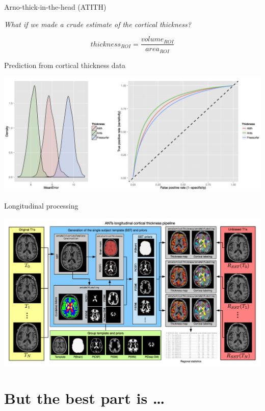 \documentclass[ignorenonframetext,]{beamer}
\begin{document}
\begin{frame}{Arno-thick-in-the-head (ATITH)}

\emph{What if we made a crude estimate of the cortical thickness?}

\[thickness_{ROI} = \frac{volume_{ROI}}{area_{ROI}}\]

\end{frame}

\begin{frame}{Prediction from cortical thickness data}

\includegraphics{./evaluation/figures/atith.png}

\end{frame}

\begin{frame}{Longitudinal processing}

\includegraphics{./longitudinal/figures/longitudinalPipeline.png}

\end{frame}

\section{But the best part is \ldots{}}\label{but-the-best-part-is}
\end{document}
